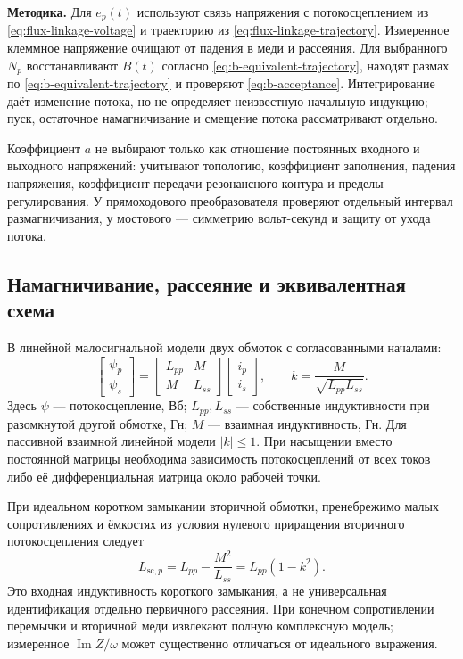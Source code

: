 \documentclass[14pt,a4paper]{extarticle}
\newcommand{\method}{\par\noindent\textbf{Методика.} }
\begin{document}
\method Для $e_p(t)$ используют связь напряжения с потокосцеплением из \eqref{eq:flux-linkage-voltage} и траекторию из \eqref{eq:flux-linkage-trajectory}. Измеренное клеммное напряжение очищают от падения в меди и рассеяния. Для выбранного $N_p$ восстанавливают $B(t)$ согласно \eqref{eq:b-equivalent-trajectory}, находят размах по \eqref{eq:b-equivalent-trajectory} и проверяют \eqref{eq:b-acceptance}. Интегрирование даёт изменение потока, но не определяет неизвестную начальную индукцию; пуск, остаточное намагничивание и смещение потока рассматривают отдельно.

Коэффициент $a$ не выбирают только как отношение постоянных входного и выходного напряжений: учитывают топологию, коэффициент заполнения, падения напряжения, коэффициент передачи резонансного контура и пределы регулирования. У прямоходового преобразователя проверяют отдельный интервал размагничивания, у мостового --- симметрию вольт-секунд и защиту от ухода потока.

\subsection{Намагничивание, рассеяние и эквивалентная схема}
В линейной малосигнальной модели двух обмоток с согласованными началами:
\begin{equation}
 \begin{bmatrix}\psi_p\\\psi_s\end{bmatrix}
 =\begin{bmatrix}L_{pp}&M\\M&L_{ss}\end{bmatrix}
 \begin{bmatrix}i_p\\i_s\end{bmatrix},\qquad
 k=\frac{M}{\sqrt{L_{pp}L_{ss}}}.
 \label{pl:eq:matrix-L}
\end{equation}
Здесь $\psi$ --- потокосцепление, Вб; $L_{pp},L_{ss}$ --- собственные индуктивности при разомкнутой другой обмотке, Гн; $M$ --- взаимная индуктивность, Гн. Для пассивной взаимной линейной модели $|k|\leq1$. При насыщении вместо постоянной матрицы необходима зависимость потокосцеплений от всех токов либо её дифференциальная матрица около рабочей точки.

При идеальном коротком замыкании вторичной обмотки, пренебрежимо малых сопротивлениях и ёмкостях из условия нулевого приращения вторичного потокосцепления следует
\begin{equation}
 L_{\mathrm{sc},p}=L_{pp}-\frac{M^2}{L_{ss}}
                 =L_{pp}(1-k^2).
 \label{pl:eq:short-circuit}
\end{equation}
Это входная индуктивность короткого замыкания, а не универсальная идентификация отдельно первичного рассеяния. При конечном сопротивлении перемычки и вторичной меди извлекают полную комплексную модель; измеренное $\operatorname{Im}Z/\omega$ может существенно отличаться от идеального выражения.
\end{document}
